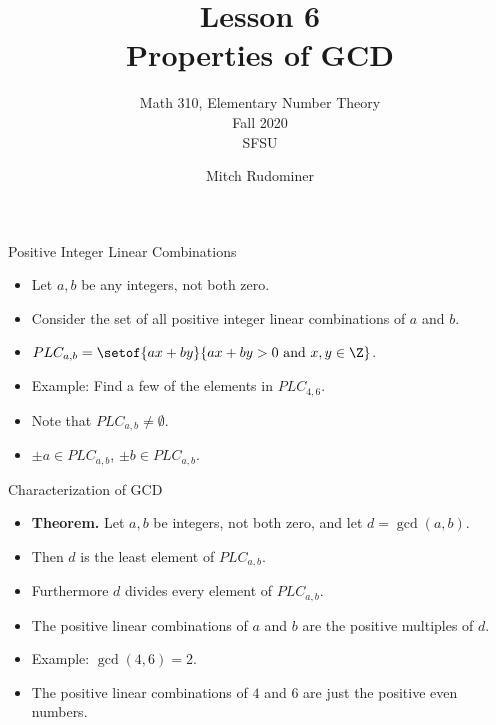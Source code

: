 \documentclass{beamer}
\title{Lesson 6 \\ Properties of GCD}
\subtitle{Math 310, Elementary Number Theory \\ Fall 2020 \\ SFSU}
\author{Mitch Rudominer}
\date{}
\begin{document}
\begin{frame}
  \titlepage
\end{frame}


\begin{frame}{Positive Integer Linear Combinations}

\begin{itemize}
  \item Let $a,b$ be any integers, not both zero.
  \item Consider the set of all positive integer linear combinations of $a$ and $b$.
  \item $PLC_{a,b}=\setof{ax+by}{ax+by > 0\text{ and }x,y\in\Z}$.
  \item Example: Find a few of the elements in $PLC_{4,6}$.
  \item Note that $PLC_{a,b}\not=\emptyset$.
  \item $\pm a\in PLC_{a,b}$, $\pm b\in PLC_{a,b}$.
\end{itemize}

\end{frame}

\begin{frame}{Characterization of GCD}

\begin{itemize}
  \item \textbf{Theorem.} Let $a,b$ be integers, not both zero, and let $d=\gcd(a,b)$.
  \item Then $d$ is the least element of $PLC_{a,b}$.
  \item Furthermore $d$ divides every element of $PLC_{a,b}$.
  \item The positive linear combinations of $a$ and $b$ are the positive multiples of $d$.
  \item Example: $\gcd(4,6) = 2$.
  \item The positive linear combinations of $4$ and $6$ are just the positive even numbers.
\end{itemize}

\end{frame}
\end{document}
